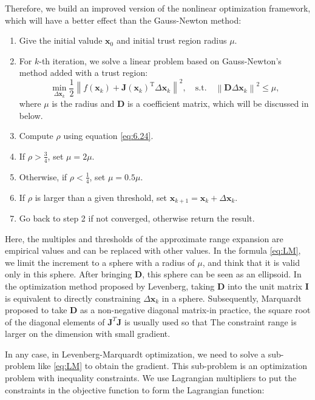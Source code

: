 Therefore, we build an improved version of the nonlinear optimization framework, which will have a better effect than the Gauss-Newton method:

\begin{mdframed}
	\begin{enumerate}
		\item Give the initial valude $\bm{x}_0$ and initial trust region radius $\mu$.
		\item For $k$-th iteration, we solve a linear problem based on Gauss-Newton's method added with a trust region: 
		\begin{equation}\label{eq:LM}
			\mathop {\min }\limits_{\Delta \bm{x}_k} \frac{1}{2}{\left\| {f\left( \bm{x}_k \right) + \bm{J} \left( \bm{x}_k \right)^\mathrm{T} \Delta \bm{x}_k} \right\|^2}, \quad \mathrm{s.t.}\quad {\left\| {\bm{D} \Delta \bm{x}_k} \right\|^2} \leqslant \mu ,
		\end{equation}
		where $\mu$ is the radius and $\bm{D}$ is a coefficient matrix, which will be discussed in below. 
		\item Compute $\rho$ using equation \eqref{eq:6.24}. 
		\item If $\rho > \frac{3}{4}$, set $\mu = 2 \mu$. 
		\item Otherwise, if $\rho < \frac{1}{4}$, set $\mu = 0.5 \mu$. 
		\item If $\rho$ is larger than a given threshold, set $\bm{x}_{k+1} = \bm{x}_k+\Delta \bm{x}_k$. 
		\item Go back to step 2 if not converged, otherwise return the result. 
	\end{enumerate}
\end{mdframed}

Here, the multiples and thresholds of the approximate range expansion are empirical values and can be replaced with other values. In the formula \eqref{eq:LM}, we limit the increment to a sphere with a radius of $\mu$, and think that it is valid only in this sphere. After bringing $\bm{D}$, this sphere can be seen as an ellipsoid. In the optimization method proposed by Levenberg, taking $\bm{D}$ into the unit matrix $\bm{I}$ is equivalent to directly constraining $\Delta \bm{x}_k$ in a sphere. Subsequently, Marquardt proposed to take $\bm{D}$ as a non-negative diagonal matrix-in practice, the square root of the diagonal elements of $\bm{J}^T \bm{J}$ is usually used so that The constraint range is larger on the dimension with small gradient.

In any case, in Levenberg-Marquardt optimization, we need to solve a sub-problem like \eqref{eq:LM} to obtain the gradient. This sub-problem is an optimization problem with inequality constraints. We use Lagrangian multipliers to put the constraints in the objective function to form the Lagrangian function:

